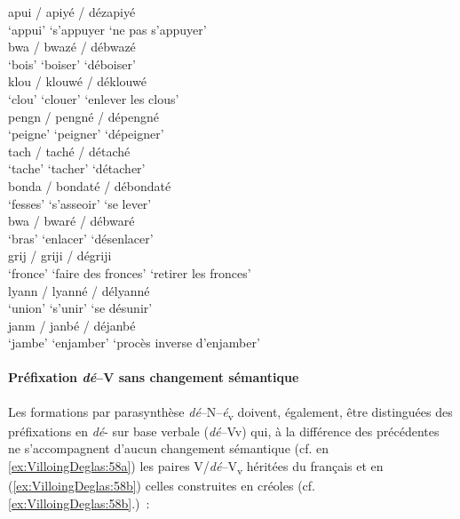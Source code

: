 \documentclass[output=paper]{langsci/langscibook}
\begin{document}
\ea \label{ex:VilloingDeglas:56}
        \ea \gll apui / apiyé  / dézapiyé\\
          {`appui'} {} {`s'appuyer} {}  {`ne pas s'appuyer'}\\
        \ex \gll  bwa / bwazé / débwazé \\
          {`bois'} {} {`boiser'} {} {`déboiser'}\\
        \ex \gll  klou / klouwé / déklouwé \\
          {`clou'} {} {`clouer'} {} {`enlever les clous'}\\
        \ex \gll  pengn / pengné / dépengné \\
          {`peigne'} {} {`peigner'} {} {`dépeigner'}\\
        \ex \gll  tach / taché / détaché \\
          {`tache'} {} {`tacher'} {} {`détacher'}\\
        \z
  \ex \label{ex:VilloingDeglas:57}
        \ea \gll bonda / bondaté / débondaté \\
          {`fesses'} {} {`s'asseoir'} {} {`se lever'}\\
        \ex \gll  bwa / bwaré / débwaré \\
          {`bras'} {} {`enlacer'} {} {`désenlacer'}\\
        \ex \gll  grij / griji / dégriji \\
          {`fronce'} {} {`faire des fronces'} {} {`retirer les fronces'}\\
        \ex \gll  lyann / lyanné / délyanné \\
          {`union'} {} {`s'unir'} {} {`se désunir'}\\
        \ex \gll  janm / janbé / déjanbé \\
          {`jambe'} {} {`enjamber'} {} {`procès inverse d'enjamber'}\\
        \z
  \z

\paragraph{Préfixation \emph{dé}--V sans changement
sémantique}\label{préfixation-dé-v-sans-changement-sémantique}

Les formations par parasynthèse \emph{dé}--N--\emph{é}\textsubscript{v} doivent,
également, être distinguées des préfixations en \emph{dé}- sur base
verbale (\emph{dé}--Vv) qui, à la différence des précédentes ne s'accompagnent
d'aucun changement sémantique (cf. en \ref{ex:VilloingDeglas:58a}) les paires
V/\emph{dé}--V\textsubscript{v} héritées du français et en (\ref{ex:VilloingDeglas:58b}) celles
construites en créoles (cf. \ref{ex:VilloingDeglas:58b}.)~:
\end{document}
